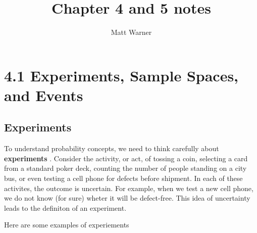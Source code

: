 \documentclass{report}
\title{\Huge{Chapter 4 and 5 notes}}
\author{\huge{Matt Warner}}
\date{\huge{}}
\begin{document}
  \maketitle

  \section*{4.1 Experiments, Sample Spaces, and Events}
  \bigbreak \noindent
  \subsection*{Experiments}
  \begin{mdframed}
    \vspace{3mm}

\begin{minipage}{0.4\textwidth}
  To understand probability concepts, we need to think carefully about \textbf{experiments}	. Consider the activity, or act, of tossing a coin, selecting a card from a standard poker deck, counting the number of people standing on a city bus, or even testing a cell phone for defects before shipment. In each of these activites, the outcome is uncertain. For example, when we test a new cell phone, we do not know (for sure) wheter it will be defect-free. This idea of uncertainty leads to the definiton of an experiment.
\end{minipage}
\hspace{7mm}\begin{minipage}{0.5\textwidth}
\end{minipage}
\vspace{3mm}
\end{mdframed}
\bigbreak \noindent \bigbreak \noindent
Here are some examples of experiements
\end{document}

